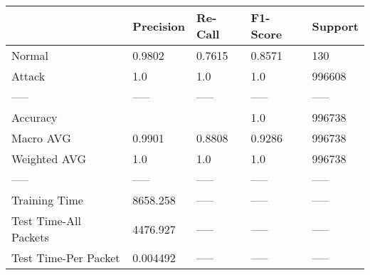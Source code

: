 \begin{tabular}{lllll}
\toprule
{} & Precision & Re-Call & F1-Score & Support \\
\midrule
Normal                &    0.9802 &  0.7615 &   0.8571 &     130 \\
Attack                &       1.0 &     1.0 &      1.0 &  996608 \\
-----                 &     ----- &   ----- &    ----- &   ----- \\
Accuracy              &           &         &      1.0 &  996738 \\
Macro AVG             &    0.9901 &  0.8808 &   0.9286 &  996738 \\
Weighted AVG          &       1.0 &     1.0 &      1.0 &  996738 \\
-----                 &     ----- &   ----- &    ----- &   ----- \\
Training Time         &  8658.258 &   ----- &    ----- &   ----- \\
Test Time-All Packets &  4476.927 &   ----- &    ----- &   ----- \\
Test Time-Per Packet  &  0.004492 &   ----- &    ----- &   ----- \\
\bottomrule
\end{tabular}
